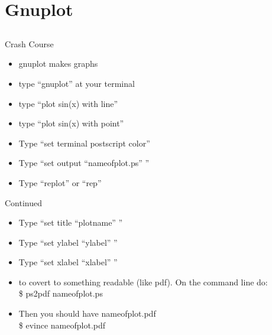\documentclass{beamer}
\begin{document}
\section{Gnuplot}
\subsection{}

\begin{frame}{Crash Course}
\begin{itemize}
\item gnuplot makes graphs
\item type ``gnuplot'' at your terminal 
\item type ``plot sin(x) with line''
\item type ``plot sin(x) with point''

\item Type ``set terminal postscript color''
\item Type ``set output ``nameofplot.ps'' ''
\item Type ``replot'' or ``rep''
\end{itemize}
\end{frame}

\begin{frame}{Continued}
\begin{itemize}
\item Type ``set title ``plotname'' ''
\item Type ``set ylabel ``ylabel'' ''                                    
\item Type ``set xlabel ``xlabel'' ''

\item to covert to something readable (like pdf).  On the command line do:\\
\$ ps2pdf nameofplot.ps
\item Then you should have nameofplot.pdf \\
\$ evince nameofplot.pdf
\end{itemize}
\end{frame}
\end{document}
